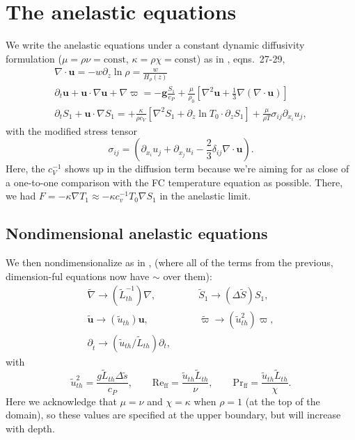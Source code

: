 \documentclass[onecolumn, amsmath, amsfonts, amssymb]{aastex62}
\newcommand{\DivU}{\ensuremath{\nabla\cdot\bm{u}}}
\newcommand{\grad}{\ensuremath{\nabla}}
\begin{document}
\section{The anelastic equations}
We write the anelastic equations under a constant dynamic diffusivity formulation 
($\mu = \rho\nu = \text{const}$, $\kappa = \rho\chi = \text{const}$)
as in \citet{lecoanet&all2014}, eqns.~27-29,
\begin{gather}
\DivU = -w\partial_z\ln\rho = \frac{w}{H_\rho(z)} 
\label{eqn:dim_continuity}\\
\partial_t \bm{u} + \bm{u}\cdot\grad\bm{u} + \grad \varpi = -\bm{g}\frac{S_1}{c_P} 
+ \frac{\mu}{\rho_0}\left[\grad^2 \bm{u} + \frac{1}{3}\grad(\DivU)\right]
\label{eqn:dim_momentum}\\
\partial_t S_1 + \bm{u}\cdot\grad S_1 = 
+\frac{\kappa}{\rho c_V}\left[\grad^2 S_1 + \partial_z\ln T_0\cdot\partial_z S_1\right]
+ \frac{\mu}{\rho T}\sigma_{ij}\partial_{x_i}u_j,
\label{eqn:dim_entropy}
\end{gather}
with the modified stress tensor
\begin{equation}
\sigma_{ij} = \left(\partial_{x_i}u_j + \partial_{x_j}u_i - \frac{2}{3}\delta_{ij}\DivU\right).
\end{equation}
Here, the $c_V^{-1}$ shows up in the diffusion term because we're aiming for as close of a
one-to-one comparison with the FC temperature equation as possible. There, we had
$F = -\kappa \grad T_1 \approx -\kappa c_v^{-1} T_0 \grad S_1$ in the anelastic limit.

\subsection{Nondimensional anelastic equations}
We then nondimensionalize as in \citet{lecoanet&jeevanjee2018}, (where all of the terms from the
previous, dimension-ful equations now have $\sim$ over them):
\begin{equation}
\begin{split}
\tilde{\grad}\rightarrow(\tilde{L}_{th}^{-1})\grad, \qquad&
\tilde{S}_1 \rightarrow(\Delta\tilde{S})S_1,\\
\tilde{\bm{u}} \rightarrow (\tilde{u}_{th})\bm{u}, \qquad&
\tilde{\varpi} \rightarrow (\tilde{u}_{th}^2)\varpi,\\
\partial_{\tilde{t}} \rightarrow (\tilde{u}_{th}/\tilde{L}_{th})\partial_t,\qquad&
\end{split}
\end{equation}
with
\begin{equation}
\tilde{u}_{th}^2 = \frac{g \tilde{L}_{th} \Delta \tilde{s}}{c_P}, \qquad
\text{Re}_{\text{ff}} = \frac{\tilde{u}_{th} \tilde{L}_{th}}{\nu}, \qquad
\text{Pr}_{\text{ff}} = \frac{\tilde{u}_{th} \tilde{L}_{th}}{\chi}.
\end{equation}
Here we acknowledge that $\mu = \nu$ and $\chi = \kappa$ when $\rho = 1$ (at the top
of the domain), so these values are specified at the upper boundary, but will increase
with depth.
\end{document}
